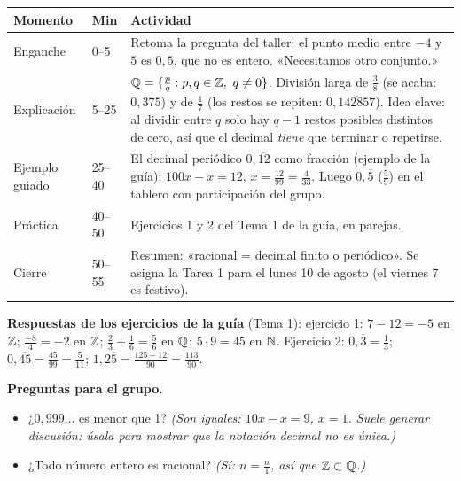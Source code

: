 \documentclass[11pt]{article}
\begin{document}
\begin{center}
{\renewcommand{\arraystretch}{1.3}
\begin{tabularx}{\linewidth}{@{}l l X@{}}
  \toprule
  \textbf{Momento} & \textbf{Min} & \textbf{Actividad}\\
  \midrule
  Enganche & 0–5 & Retoma la pregunta del taller: el punto medio entre $-4$ y $5$ es
    $0{,}5$, que no es entero. «Necesitamos otro conjunto.»\\
  Explicación & 5–25 & $\mathbb{Q} = \{\frac{p}{q} : p, q \in \mathbb{Z},\ q \neq 0\}$. División larga de
    $\frac{3}{8}$ (se acaba: $0{,}375$) y de $\frac{1}{7}$ (los restos se repiten:
    $0{,}\overline{142857}$). Idea clave: al dividir entre $q$ solo hay $q - 1$ restos
    posibles distintos de cero, así que el decimal \emph{tiene} que terminar o repetirse.\\
  Ejemplo guiado & 25–40 & El decimal periódico $0{,}\overline{12}$ como fracción (ejemplo de
    la guía): $100x - x = 12$, $x = \frac{12}{99} = \frac{4}{33}$. Luego $0{,}\overline{5}$
    ($\frac{5}{9}$) en el tablero con participación del grupo.\\
  Práctica & 40–50 & Ejercicios 1 y 2 del Tema 1 de la guía, en parejas.\\
  Cierre & 50–55 & Resumen: «racional = decimal finito o periódico». Se asigna la Tarea 1
    para el lunes 10 de agosto (el viernes 7 es festivo).\\
  \bottomrule
\end{tabularx}}
\end{center}

\textbf{Respuestas de los ejercicios de la guía} (Tema 1): ejercicio 1: $7 - 12 = -5$ en
$\mathbb{Z}$; $\frac{-8}{4} = -2$ en $\mathbb{Z}$; $\frac{2}{3} + \frac{1}{6} = \frac{5}{6}$ en $\mathbb{Q}$;
$5 \cdot 9 = 45$ en $\mathbb{N}$. Ejercicio 2: $0{,}\overline{3} = \frac{1}{3}$;
$0{,}\overline{45} = \frac{45}{99} = \frac{5}{11}$; $1{,}2\overline{5} =
\frac{125 - 12}{90} = \frac{113}{90}$.

\textbf{Preguntas para el grupo.}
\begin{itemize}
  \item ¿$0{,}999\ldots$ es menor que 1? \emph{(Son iguales: $10x - x = 9$, $x = 1$. Suele
        generar discusión: úsala para mostrar que la notación decimal no es única.)}
  \item ¿Todo número entero es racional? \emph{(Sí: $n = \frac{n}{1}$, así que $\mathbb{Z} \subset \mathbb{Q}$.)}
\end{itemize}
\end{document}
